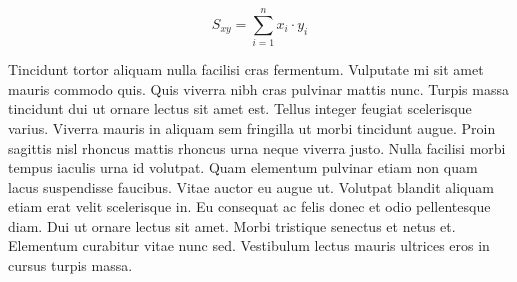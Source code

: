 \documentclass{article}
\begin{document}
    \begin{equation}
    	S_{xy}=\sum_{i=1}^{n}x_i\cdot y_i
    \end{equation}
    
    Tincidunt tortor aliquam nulla facilisi cras fermentum. Vulputate mi sit amet mauris commodo quis. Quis viverra nibh cras pulvinar mattis nunc. Turpis massa tincidunt dui ut ornare lectus sit amet est. Tellus integer feugiat scelerisque varius. Viverra mauris in aliquam sem fringilla ut morbi tincidunt augue. Proin sagittis nisl rhoncus mattis rhoncus urna neque viverra justo. Nulla facilisi morbi tempus iaculis urna id volutpat. Quam elementum pulvinar etiam non quam lacus suspendisse faucibus. Vitae auctor eu augue ut. Volutpat blandit aliquam etiam erat velit scelerisque in. Eu consequat ac felis donec et odio pellentesque diam. Dui ut ornare lectus sit amet. Morbi tristique senectus et netus et. Elementum curabitur vitae nunc sed. Vestibulum lectus mauris ultrices eros in cursus turpis massa.
    
\end{document}
